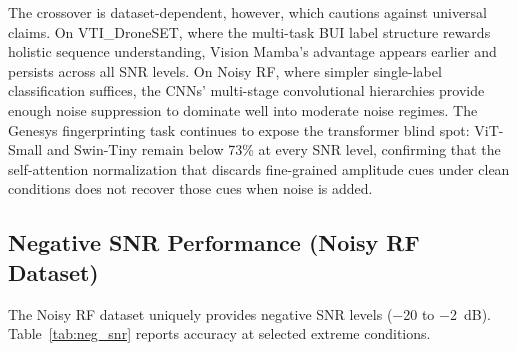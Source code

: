 \documentclass[runningheads]{llncs}
\begin{document}
The crossover is dataset-dependent, however, which cautions against universal claims. On VTI\_DroneSET, where the multi-task BUI label structure rewards holistic sequence understanding, Vision Mamba's advantage appears earlier and persists across all SNR levels. On Noisy RF, where simpler single-label classification suffices, the CNNs' multi-stage convolutional hierarchies provide enough noise suppression to dominate well into moderate noise regimes. The Genesys fingerprinting task continues to expose the transformer blind spot: ViT-Small and Swin-Tiny remain below 73\% at every SNR level, confirming that the self-attention normalization that discards fine-grained amplitude cues under clean conditions does not recover those cues when noise is added.

\subsection{Negative SNR Performance (Noisy RF Dataset)}

The Noisy RF dataset uniquely provides negative SNR levels ($-$20 to $-$2~dB). Table~\ref{tab:neg_snr} reports accuracy at selected extreme conditions.

\begin{table}[htbp]
\centering
\caption{Classification Accuracy (\%) at Negative SNR Levels --- Noisy RF Dataset}
\label{tab:neg_snr}
\renewcommand{\arraystretch}{1.15}
\end{table}
\end{document}
